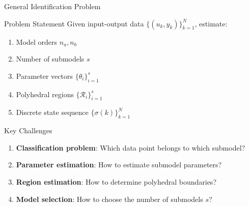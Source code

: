 \documentclass[aspectratio=169]{beamer}
\begin{document}
\begin{frame}{General Identification Problem}
\begin{block}{Problem Statement}
Given input-output data $\{(u_k, y_k)\}_{k=1}^N$, estimate:
\begin{enumerate}
\item Model orders $n_a, n_b$
\item Number of submodels $s$
\item Parameter vectors $\{\theta_i\}_{i=1}^s$
\item Polyhedral regions $\{\mathcal{R}_i\}_{i=1}^s$
\item Discrete state sequence $\{\sigma(k)\}_{k=1}^N$
\end{enumerate}
\end{block}

\begin{alertblock}{Key Challenges}
\begin{enumerate}
\item \textbf{Classification problem}: Which data point belongs to which submodel?
\item \textbf{Parameter estimation}: How to estimate submodel parameters?
\item \textbf{Region estimation}: How to determine polyhedral boundaries?
\item \textbf{Model selection}: How to choose the number of submodels $s$?
\end{enumerate}
\end{alertblock}
\end{frame}
\end{document}
